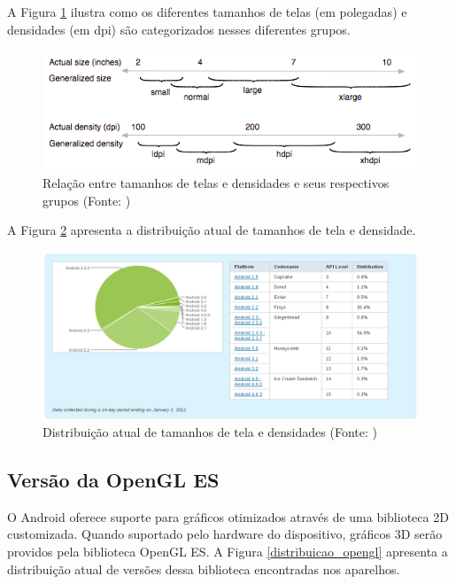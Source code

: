 A Figura \ref{intervalos_telas} ilustra como os diferentes tamanhos de telas 
(em polegadas) e 
densidades (em dpi) são categorizados nesses diferentes grupos.

\begin{figure}[h]
    \centering
    \includegraphics[width=15cm]{img/intervalos_telas}
    \caption[Relação entre tamanhos de telas e densidades e seus respectivos grupos]{Relação entre tamanhos de telas e densidades e seus respectivos grupos 
        (Fonte: \cite{sup_multi_screens}) }
    \label{intervalos_telas}
\end{figure}

A Figura \ref{distribuicao_telas} apresenta a distribuição atual de tamanhos 
de tela e densidade.

\begin{figure}[h]
    \centering
    \includegraphics[width=15cm]{img/api_level}
    \caption[Distribuição atual de tamanhos de tela e densidades]{Distribuição atual de tamanhos de tela e densidades (Fonte: \cite{sup_multi_screens})}
    \label{distribuicao_telas}
\end{figure}


\subsection{Versão da OpenGL ES}

O Android oferece suporte para gráficos otimizados através de uma biblioteca 2D 
customizada. Quando suportado pelo hardware do dispositivo, gráficos 3D serão 
providos pela biblioteca OpenGL ES. A Figura \ref{distribuicao_opengl} apresenta 
a distribuição atual de versões dessa biblioteca encontradas nos aparelhos.

